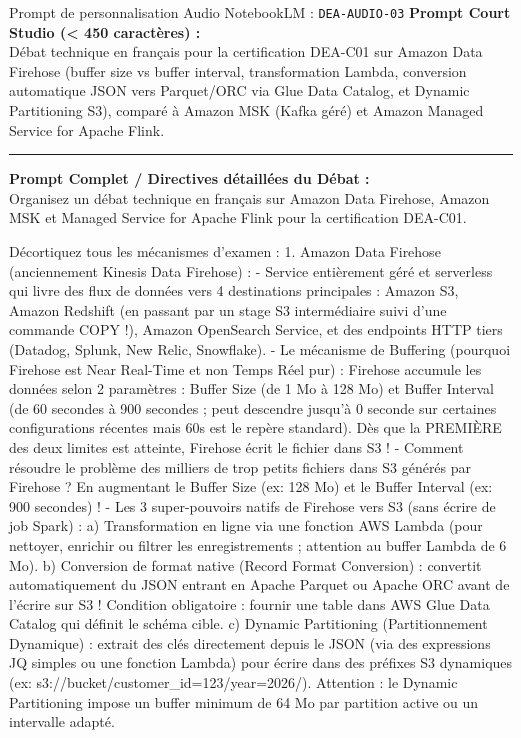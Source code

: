 \documentclass[11pt,a4paper]{article}
\begin{document}
\begin{promptbox}{Prompt de personnalisation Audio NotebookLM : \texttt{DEA-AUDIO-03}}
\textbf{Prompt Court Studio (< 450 caractères) :}\\
Débat technique en français pour la certification DEA-C01 sur Amazon Data Firehose (buffer size vs buffer interval, transformation Lambda, conversion automatique JSON vers Parquet/ORC via Glue Data Catalog, et Dynamic Partitioning S3), comparé à Amazon MSK (Kafka géré) et Amazon Managed Service for Apache Flink.

\medskip\hrule\medskip
\textbf{Prompt Complet / Directives détaillées du Débat :}\\
Organisez un débat technique en français sur Amazon Data Firehose, Amazon MSK et Managed Service for Apache Flink pour la certification DEA-C01.

Décortiquez tous les mécanismes d'examen :
1. Amazon Data Firehose (anciennement Kinesis Data Firehose) :
- Service entièrement géré et serverless qui livre des flux de données vers 4 destinations principales : Amazon S3, Amazon Redshift (en passant par un stage S3 intermédiaire suivi d'une commande COPY !), Amazon OpenSearch Service, et des endpoints HTTP tiers (Datadog, Splunk, New Relic, Snowflake).
- Le mécanisme de Buffering (pourquoi Firehose est Near Real-Time et non Temps Réel pur) :
  Firehose accumule les données selon 2 paramètres : Buffer Size (de 1 Mo à 128 Mo) et Buffer Interval (de 60 secondes à 900 secondes ; peut descendre jusqu'à 0 seconde sur certaines configurations récentes mais 60s est le repère standard). Dès que la PREMIÈRE des deux limites est atteinte, Firehose écrit le fichier dans S3 !
- Comment résoudre le problème des milliers de trop petits fichiers dans S3 générés par Firehose ? En augmentant le Buffer Size (ex: 128 Mo) et le Buffer Interval (ex: 900 secondes) !
- Les 3 super-pouvoirs natifs de Firehose vers S3 (sans écrire de job Spark) :
  a) Transformation en ligne via une fonction AWS Lambda (pour nettoyer, enrichir ou filtrer les enregistrements ; attention au buffer Lambda de 6 Mo).
  b) Conversion de format native (Record Format Conversion) : convertit automatiquement du JSON entrant en Apache Parquet ou Apache ORC avant de l'écrire sur S3 ! Condition obligatoire : fournir une table dans AWS Glue Data Catalog qui définit le schéma cible.
  c) Dynamic Partitioning (Partitionnement Dynamique) : extrait des clés directement depuis le JSON (via des expressions JQ simples ou une fonction Lambda) pour écrire dans des préfixes S3 dynamiques (ex: s3://bucket/customer\_id=123/year=2026/). Attention : le Dynamic Partitioning impose un buffer minimum de 64 Mo par partition active ou un intervalle adapté.


\end{promptbox}
\end{document}

